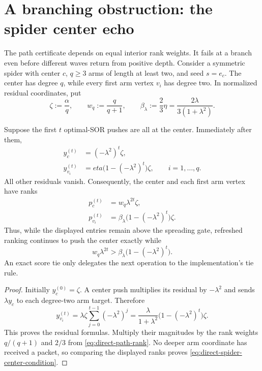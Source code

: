 \section{A branching obstruction: the spider center echo}
\label{sec:direct-spider-center}

The path certificate depends on equal interior rank weights. It fails at a
branch even before different waves return from positive depth. Consider a
symmetric spider with center $c$, $q\geq3$ arms of length at least two, and
seed $s=e_c$. The center has degree $q$, while every first arm vertex
$v_i$ has degree two. In normalized residual coordinates, put
\begin{equation}
 \zeta:=\frac{\alpha}{q},
 \qquad
 w_q:=\frac{q}{q+1},
 \qquad
 \beta_\lambda:=\frac23\eta
 =\frac{2\lambda}{3(1+\lambda^2)}.
 \label{eq:direct-spider-parameters}
\end{equation}

\begin{proposition}
\label{prop:direct-spider-center-prefix}
Suppose the first $t$ optimal-SOR pushes are all at the center. Immediately
after them,
\begin{align}
 y_c^{(t)}&=(-\lambda^2)^t\zeta,
 \label{eq:direct-spider-center-residual}\\
 y_{v_i}^{(t)}&=eta\bigl(1-(-\lambda^2)^t\bigr)\zeta,
 \qquad i=1,\ldots,q.
 \label{eq:direct-spider-arm-residual}
\end{align}
All other residuals vanish. Consequently, the center and each first arm
vertex have ranks
\begin{align}
 p_c^{(t)}&=w_q\lambda^{2t}\zeta,
 \label{eq:direct-spider-center-rank}\\
 p_{v_i}^{(t)}&=\beta_\lambda
 \bigl(1-(-\lambda^2)^t\bigr)\zeta.
 \label{eq:direct-spider-arm-rank}
\end{align}
Thus, while the displayed entries remain above the spreading gate, refreshed
ranking continues to push the center exactly while
\begin{equation}
 w_q\lambda^{2t}>
 \beta_\lambda\bigl(1-(-\lambda^2)^t\bigr).
 \label{eq:direct-spider-center-condition}
\end{equation}
An exact score tie only delegates the next operation to the implementation's
tie rule.
\end{proposition}

\begin{proof}
Initially $y_c^{(0)}=\zeta$. A center push multiplies its residual by
$-\lambda^2$ and sends $\lambda y_c$ to each degree-two arm target. Therefore
\begin{equation*}
 y_{v_i}^{(t)}
 =\lambda\zeta\sum_{j=0}^{t-1}(-\lambda^2)^j
 =\frac{\lambda}{1+\lambda^2}
   \bigl(1-(-\lambda^2)^t\bigr)\zeta.
\end{equation*}
This proves the residual formulas. Multiply their magnitudes by the rank
weights $q/(q+1)$ and $2/3$ from \cref{eq:direct-path-rank}. No deeper arm
coordinate has received a packet, so comparing the displayed ranks proves
\cref{eq:direct-spider-center-condition}.
\end{proof}

